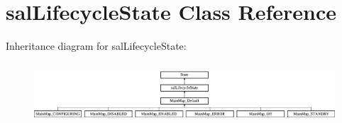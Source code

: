 \hypertarget{classsal_lifecycle_state}{\section{sal\-Lifecycle\-State Class Reference}
\label{classsal_lifecycle_state}
}
Inheritance diagram for sal\-Lifecycle\-State\-:\begin{figure}[H]
\begin{center}
\leavevmode
\includegraphics[height=2.262626cm]{classsal_lifecycle_state}
\end{center}
\end{figure}
